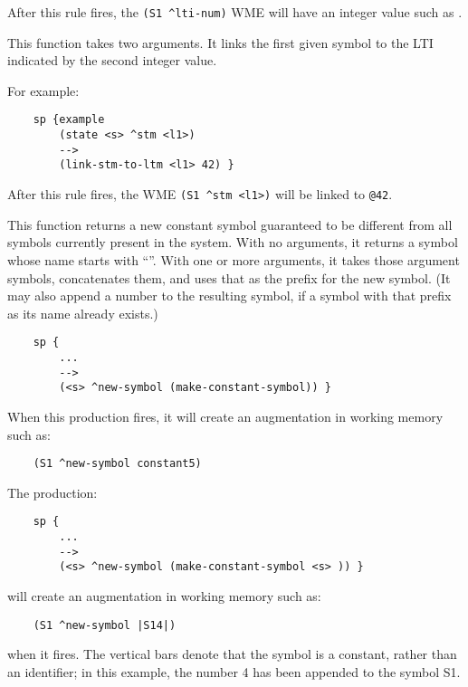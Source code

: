 \begin{description}
	After this rule fires, the \verb|(S1 ^lti-num)| WME will have an integer value such as .


\item [\soarb{link-stm-to-ltm} --- ] 
	This function takes two arguments. It links the first given symbol to the LTI indicated by the second integer value.
	
	For example:
	
	\begin{verbatim}
	sp {example
	    (state <s> ^stm <l1>)
	    -->
	    (link-stm-to-ltm <l1> 42) }
	\end{verbatim}
	
	After this rule fires, the WME \verb=(S1 ^stm <l1>)= will be linked to \verb=@42=.


\item [\soarb{make-constant-symbol} --- ] 
	This function returns a new constant symbol guaranteed to be different from all symbols currently present in the system.  With no arguments, it returns a symbol whose name starts with ``''.  With one or more arguments, it takes those argument symbols, concatenates them, and uses that as the prefix for the new symbol. (It may also append a number to the resulting symbol, if a symbol with that prefix as its name already exists.)

	\begin{verbatim}
	sp {
	    ...
	    -->
	    (<s> ^new-symbol (make-constant-symbol)) }
	\end{verbatim}
	
	When this production fires, it will create an augmentation in working memory such as:

	\begin{verbatim}
	(S1 ^new-symbol constant5)
	\end{verbatim} 
	\vspace{12pt}
	
	The production:

	\begin{verbatim}
	sp {
	    ...
	    -->
	    (<s> ^new-symbol (make-constant-symbol <s> )) }
	\end{verbatim}
	
	will create an augmentation in working memory such as:
	\begin{verbatim}
	(S1 ^new-symbol |S14|)
	\end{verbatim}
	
	when it fires. The vertical bars denote that the symbol is a constant, rather than an identifier; in this example, the number 4 has been appended to the symbol S1.


\end{description}
